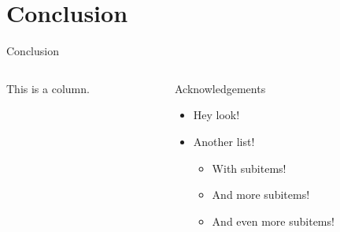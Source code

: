 \documentclass[aspectratio=169]{beamer}
\begin{document}
\section{Conclusion}

\begin{frame}{Conclusion}
    \begin{columns}
        \begin{column}{0.5\textwidth}
            This is a column.
        \end{column}
        \begin{column}{0.5\textwidth}
            \begin{center}
                \alert{Acknowledgements}
                \begin{itemize}
                    \item Hey look!
                    \item Another list!
                    \begin{itemize}
                        \item With subitems!
                        \item And more subitems!
                        \item And even more subitems!
                    \end{itemize}
                \end{itemize}
            \end{center}
        \end{column}
    \end{columns}
\end{frame}
\end{document}
